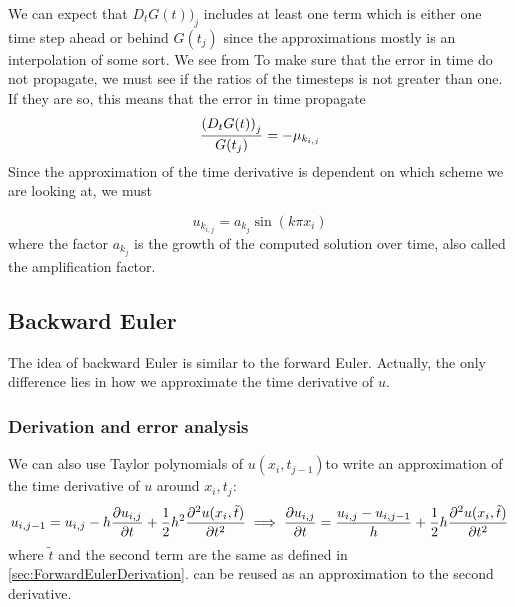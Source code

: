 \documentclass[12pt,english,a4paper]{article}
\begin{document}
We can expect that \( D_tG(t))_j\) includes at least one term which is either one time step ahead or behind \(G(t_j)\) since the approximations mostly is an interpolation of some sort. We see from To make sure that the error in time do not propagate, we must see if the ratios of the timesteps is not greater than one. If they are so, this means that the error in time propagate
\[
\frac{\qty(D_tG(t))_j}{G(t_j)} = -\mu_{k_{i,j}}
\]
Since the approximation of the time derivative is dependent on which scheme we are looking at, we must

\[
u_{k_{i,j}} = a_{k_{j}}\sin(k \pi x_i)
\]
where the factor \(a_{k_j}\) is the growth of the computed solution over time, also called the amplification factor.
%
\subsection{Backward Euler} \label{sec:backwardEuler}
The idea of backward Euler is similar to the forward Euler. Actually, the only difference lies in how we approximate the time derivative of \(u\).
\subsubsection{Derivation and error analysis}
We can also use Taylor polynomials of \(u(x_i,t_{j-1})\)to write an approximation of the time derivative of \(u\) around \(x_i,t_j\):
\[
    u_{i,j-1} = u_{i,j} - h\pdv{u_{i,j}}{t} + \frac{1}{2}h^2\pdv[2]{u(x_i,\tilde{t})}{t}
    \implies \pdv{u_{i,j}}{t} = \frac{u_{i,j}-u_{i,j-1}}{h} + \frac{1}{2}h\pdv[2]{u(x_i,\tilde{t})}{t}
\]
where \(\tilde{t}\) and the second term are the same as defined in \vref{sec:ForwardEulerDerivation}.  can be reused as an approximation to the second derivative.
\end{document}
